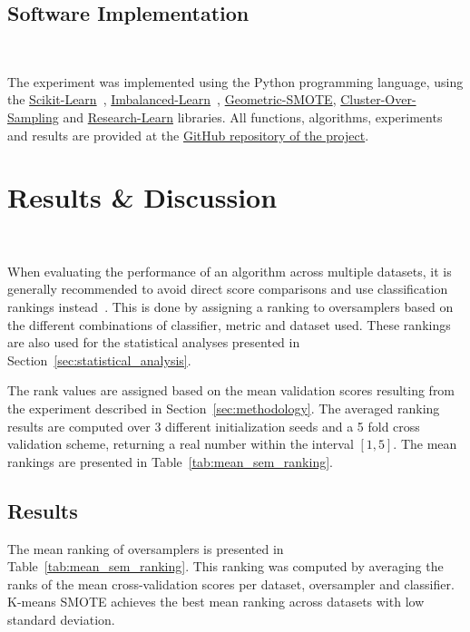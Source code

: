 \documentclass[information,article,submit,moreauthors,pdftex]{Definitions/mdpi}
\begin{document}
\begin{paracol}{2}
\linenumbers
\switchcolumn

\subsection{Software Implementation}~\label{sec:implementation}

The experiment was implemented using the Python programming language, using the
\href{https://scikit-learn.org/stable/}{Scikit-Learn}~\citep{Pedregosa2011},
\href{https://imbalanced-learn.org/en/stable/}{Imbalanced-Learn}~\citep{JMLR:v18:16-365},
\href{https://geometric-smote.readthedocs.io/en/latest/?badge=latest}{Geometric-SMOTE},
\href{https://cluster-over-sampling.readthedocs.io/en/latest/?badge=latest}{Cluster-Over-Sampling}
and \href{https://research-learn.readthedocs.io/en/latest/?badge=latest}{Research-Learn} libraries.
All functions, algorithms, experiments and results are provided at the
\href{https://github.com/AlgoWit/publications}{GitHub
repository of the project}.

\section{Results \& Discussion}~\label{sec:results}

When evaluating the performance of an algorithm across multiple datasets, it
is generally recommended to avoid direct score comparisons and use
classification rankings instead~\citep{demvsar2006}. This is done by assigning
a ranking to oversamplers based on the different combinations of classifier,
metric and dataset used. These rankings are also used for the statistical
analyses presented in Section~\ref{sec:statistical_analysis}.

The rank values are assigned based on the mean validation scores resulting
from the experiment described in Section~\ref{sec:methodology}. The averaged
ranking results are computed over 3 different initialization seeds and a 5
fold cross validation scheme, returning a real number within the interval
$[1,5]$. The mean rankings are presented in Table~\ref{tab:mean_sem_ranking}.

\subsection{Results}

The mean ranking of oversamplers is presented in
Table~\ref{tab:mean_sem_ranking}. This ranking was computed by averaging the
ranks of the mean cross-validation scores per dataset, oversampler and
classifier. K-means SMOTE achieves the best mean ranking across datasets with
low standard deviation.

\end{paracol}
\end{document}

